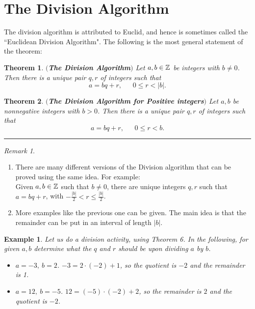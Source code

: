 \documentclass[12pt]{article}
\theoremstyle{plain}
\newtheorem{example}{Example}
\newtheorem{theorem}{Theorem}
\theoremstyle{definition}
\theoremstyle{remark}
\newtheorem{remark}{Remark}
\begin{document}
\section{The Division Algorithm} 

The division algorithm is attributed to Euclid, and hence is sometimes called the ``Euclidean Division Algorithm". The following is the most general statement of the theorem:
\begin{theorem} {\bf $($The Division Algorithm$)$ }
Let $a, b \in \mathbb{Z}$ be integers with $b\neq 0$. Then there is a unique pair $q,r$ of integers such that 
$$a=bq+r, \:\:\:\:\:\:\: 0\leq r<|b|.$$
\end{theorem}

\begin{theorem} {\bf $($The Division Algorithm for Positive integers$)$ }
Let $a, b$ be nonnegative integers with $b>0$. Then there is a unique pair $q,r$ of integers such that 
$$a=bq+r, \:\:\:\:\:\:\: 0\leq r<b.$$
\end{theorem}

\hrule

\bigskip
\noindent

\begin{remark}
    \begin{enumerate}
        \item There are many different versions of the Division algorithm that can be proved using the same idea. For example:
        \\
        Given $a,b\in \mathbb{Z}$ such that $b\neq 0$, there are unique integers $q,r$ such that $a=bq+r$, with $-\frac{|b|}{2} < r\leq \frac{|b|}{2}$. 
    \item More examples like the previous one can be given. The main idea is that the remainder can be put in an interval of length $|b|$.
    \end{enumerate}
\end{remark}

\begin{example}
    Let us do a division activity, using Theorem 6. In the following, for given $a, b$ determine what the $q$ and $r$ should be upon dividing $a$ by $b$.  

\begin{itemize}
    \item $a=-3,\: b=2$. $-3=2\cdot (-2)+1$, so the quotient is $-2$ and the remainder is 1.
    \item $a=12,\: b=-5$.  $12 = (-5)\cdot (-2)+2$, so the remainder is $2$ and the quotient is $-2$.
\end{itemize}
\end{example}
\end{document}
